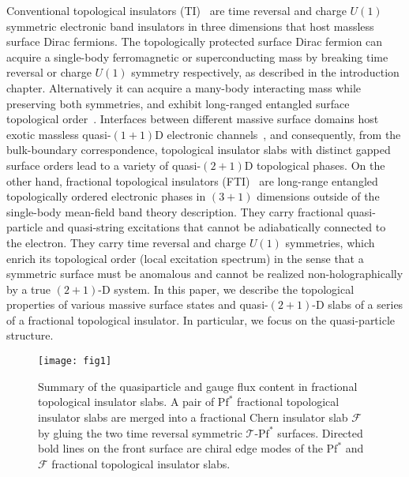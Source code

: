 Conventional topological insulators (\hypertarget{TI}{TI})~\cite{FuKaneMele3D,Roy07,MooreBalents07,QiHughesZhang08} are time reversal and charge $U(1)$ symmetric electronic band insulators in three dimensions that host massless surface Dirac fermions. The topologically protected surface Dirac fermion can acquire a single-body ferromagnetic or superconducting mass by breaking time reversal or charge $U(1)$ symmetry respectively, as described in the introduction chapter. Alternatively it can acquire a many-body interacting mass while preserving both symmetries, and exhibit long-ranged entangled surface topological order~\cite{WangPotterSenthilgapTI13,MetlitskiKaneFisher13b,ChenFidkowskiVishwanath14,BondersonNayakQi13}. Interfaces between different massive surface domains host exotic massless quasi-$(1+1)$D electronic channels~\cite{TeoKane,FuKanechargetransport09,QiWittenZhang13}, and consequently, from the bulk-boundary correspondence, topological insulator slabs with distinct gapped surface orders lead to a variety of quasi-$(2+1)$D topological phases. 
On the other hand, fractional topological insulators (\hypertarget{FTI}{FTI})~\cite{MaciejkoQiKarchZhang10,SwingleBarkeshliMcGreevySenthil11,maciejko2012models,ye2016composite,maciejko2015fractionalized,stern2016fractional,YeChengFradkin17} are long-range entangled topologically ordered electronic phases in $(3+1)$ dimensions outside of the single-body mean-field band theory description. They carry fractional quasi-particle and quasi-string excitations that cannot be adiabatically connected to the electron. 
They carry time reversal and charge $U(1)$ symmetries, which enrich its topological order (local excitation spectrum) in the sense that a symmetric surface must be anomalous and cannot be realized non-holographically by a true $(2+1)$-D system. In this paper, we describe the topological properties of various massive surface states and quasi-$(2+1)$-D slabs of a series of a fractional topological insulator. In particular, we focus on the quasi-particle structure.

\begin{figure}[htbp]
\centering\texttt{[image: fig1]}
\caption{Summary of the quasiparticle and gauge flux content in fractional topological insulator slabs. A pair of $\mathrm{Pf}^\ast$ fractional topological insulator slabs are merged into a fractional Chern insulator slab $\mathcal{F}$ by gluing the two time reversal symmetric $\mathcal{T}$-$\mathrm{Pf}^\ast$ surfaces. Directed bold lines on the front surface are chiral edge modes of the $\mathrm{Pf}^\ast$ and $\mathcal{F}$ fractional topological insulator slabs.}\label{fig1}
\end{figure}

